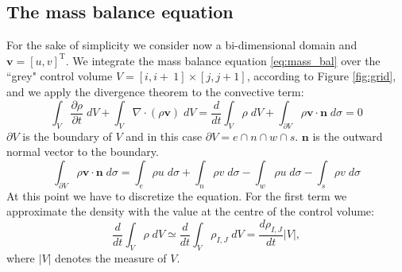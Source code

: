 \documentclass[12pt, a4paper]{article}
\begin{document}
\subsection{The mass balance equation}
For the sake of simplicity we consider now a bi-dimensional domain and 
$\mathbf{v} = [u, v]^{\mathrm{T}}$.
We integrate the mass balance equation \eqref{eq:mass_bal} over the ``grey" 
control 
volume $V = [i,i+~1] \times [j,j+1]$, according to Figure \ref{fig:grid}, and 
we apply the divergence theorem to the convective term:
\begin{equation*}
\int_V \frac{\partial\rho}{\partial t} \; dV + \int_V \nabla \cdot (\rho 
\mathbf{v}) \; dV = \frac{d}{dt} \int_V \rho \; dV + \int_{\partial V} \rho 
\mathbf{v} \cdot \mathbf{n} \; d\sigma = 0
\end{equation*}
$\partial V$ is the boundary of $V$ and in this case $\partial V = e \cap n 
\cap w \cap s$. $\mathbf{n}$ is the outward normal vector to the boundary.
\begin{equation*}
\int_{\partial V} \rho 
\mathbf{v} \cdot \mathbf{n} \; d\sigma = \int_e \rho 
u \; d\sigma + \int_n \rho v \; d\sigma - \int_w \rho u \; d\sigma - \int_s 
\rho v \; d\sigma
\end{equation*}
At this point we have to discretize the equation. For the first term we 
approximate the density with the value at the centre of the control volume:
\begin{equation*}
\frac{d}{dt} \int_V \rho \; dV \simeq \frac{d}{dt} \int_V \rho_{I,J} \; dV = 
\frac{d \rho_{I,J}}{dt} |V|,
\end{equation*}
where $|V|$ denotes the measure of $V$.
\end{document}
